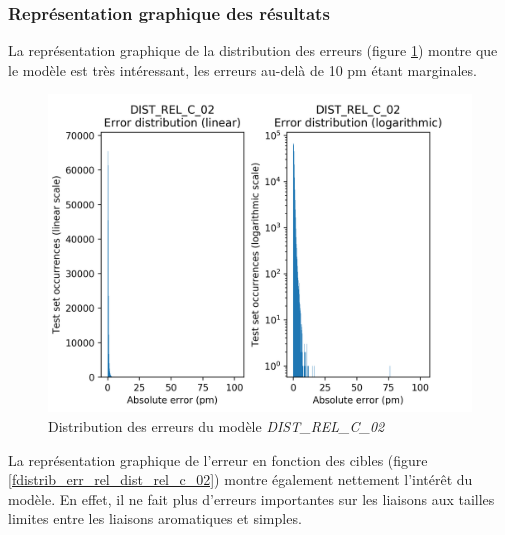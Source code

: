 \subsubsection{Représentation graphique des résultats}
\par La représentation graphique de la distribution des erreurs (figure \ref{fdistrib_err_dist_rel_c_02}) montre que le modèle est très intéressant, les erreurs au-delà de 10 pm étant marginales. \\

\begin{figure}
	\centering
	
	\includegraphics[scale=0.7]{../figures/DIST_REL_C_02/DIST_REL_C_02_distrib_rmse_val.png}	

	\caption{Distribution des erreurs du modèle \emph{DIST\_REL\_C\_02}}
	\label{fdistrib_err_dist_rel_c_02}
\end{figure}

\par La représentation graphique de l'erreur en fonction des cibles (figure \ref{fdistrib_err_rel_dist_rel_c_02}) montre également nettement l'intérêt du modèle. En effet, il ne fait plus d'erreurs importantes sur les liaisons aux tailles limites entre les liaisons aromatiques et simples. \\


